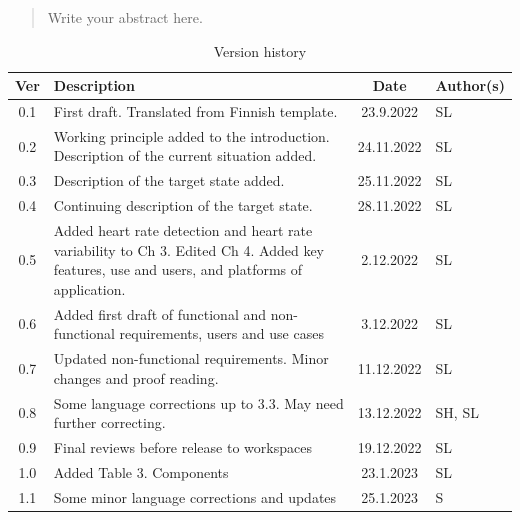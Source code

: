 \documentclass{article}
\begin{document}
\newpage

\begin{abstract}
Write your abstract here.
\end{abstract}





\begin{table}[h]
\centering
\caption{Version history}
\label{tab:version_history}
\begin{tabular}{|c|p{5cm}|c|l|}
\hline
\textbf{Ver} & \textbf{Description} & \textbf{Date} & \textbf{Author(s)} \\
\hline
0.1 & First draft. Translated from Finnish template. & 23.9.2022 & SL \\
\hline
0.2 & Working principle added to the introduction. Description of the current situation added. & 24.11.2022 & SL \\
\hline
0.3 & Description of the target state added. & 25.11.2022 & SL \\
\hline
0.4 & Continuing description of the target state. & 28.11.2022 & SL \\
\hline
0.5 & Added heart rate detection and heart rate variability to Ch 3. Edited Ch 4. Added key features, use and users, and platforms of application. & 2.12.2022 & SL \\
\hline
0.6 & Added first draft of functional and non-functional requirements, users and use cases & 3.12.2022 & SL \\
\hline
0.7 & Updated non-functional requirements. Minor changes and proof reading. & 11.12.2022 & SL \\
\hline
0.8 & Some language corrections up to 3.3. May need further correcting. & 13.12.2022 & SH, SL \\
\hline
0.9 & Final reviews before release to workspaces & 19.12.2022 & SL \\
\hline
1.0 & Added Table 3. Components & 23.1.2023 & SL \\
\hline
1.1 & Some minor language corrections and updates & 25.1.2023 & S \\
\hline
\end{tabular}
\end{table}

\pagebreak

\tableofcontents

\newpage
\end{document}
